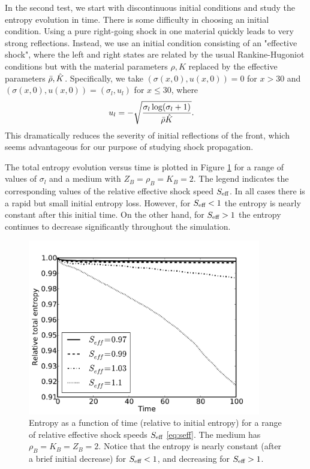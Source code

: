 
In the second test, we start with discontinuous initial conditions and
study the entropy evolution in time.  There is some difficulty in choosing
an initial condition.  Using a pure right-going shock in one material quickly 
leads to very strong reflections.  Instead,
we use an initial condition consisting of an "effective shock", where the
left and right states are related by the usual Rankine-Hugoniot conditions
but with the material parameters $\rho,K$ replaced by the effective parameters
$\bar{\rho},\hat{K}$.  Specifically, we take $(\sigma(x,0),u(x,0))=0$ for $x>30$
and $(\sigma(x,0),u(x,0))=(\sigma_l,u_l)$ for $x\le 30$, where
\begin{align*}
u_l & =-\sqrt{\frac{\sigma_l \log(\sigma_l+1)}{\bar{\rho}\hat{K}}}.
\end{align*}
This dramatically reduces the severity of initial reflections of the front,
which seems advantageous for our purpose of studying shock propagation.

The total entropy evolution versus time is plotted in Figure \ref{fig:ent_cshockic}
for a range of values of $\sigma_l$ and a medium with $Z_B=\rho_B=K_B=2$.  
The legend indicates the corresponding values
of the relative effective shock speed $S_\textup{eff}$.  In all cases there
is a rapid but small initial entropy loss.  However, for $S_\textup{eff}<1$
the entropy is nearly constant after this initial time.  On the other hand, for
$S_\textup{eff}>1$ the entropy continues to decrease significantly throughout the simulation.

\begin{figure}
\centerline{
\includegraphics[width=4in]{figures/shock_ic_entropy_Z2.pdf}}
\caption{Entropy as a function of time (relative to initial entropy)
for a range of relative effective shock speeds $S_\textup{eff}$ \eqref{eq:seff}.
The medium has $\rho_B=K_B=Z_B=2$.
Notice that the entropy is nearly constant (after a brief initial decrease) for
$S_\textup{eff}<1$, and decreasing for $S_\textup{eff}>1$.\label{fig:ent_cshockic}}
\end{figure}

